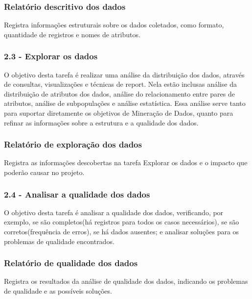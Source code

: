 \subsubsection*{Relatório descritivo dos dados}

Registra informações estruturais sobre os dados coletados, como formato, quantidade de registros e nomes de atributos.

\subsubsection*{\textbf{2.3 - Explorar os dados}}

O objetivo desta tarefa é realizar uma análise da distribuição dos dados, através de consultas, visualizações e técnicas de report. Nela estão inclusas análise da distribuição de atributos dos dados, análise do relacionamento entre pares de atributos, análise de subpopulações e análise estatística. Essa análise serve tanto para suportar diretamente os objetivos de Mineração de Dados, quanto para refinar as informações sobre a estrutura e a qualidade dos dados.

\subsubsection*{Relatório de exploração dos dados}

Registra as informações descobertas na tarefa Explorar os dados e o impacto que poderão causar no projeto.

\subsubsection*{\textbf{2.4 - Analisar a qualidade dos dados}}

O objetivo desta tarefa é analisar a qualidade dos dados, verificando, por exemplo, se são completos(há registros para todos os casos necessários), se são corretos(frequência de erros), se há dados ausentes; e analisar soluções para os problemas de qualidade encontrados.

\subsubsection*{Relatório de qualidade dos dados}

Registra os resultados da análise de qualidade dos dados, indicando os problemas de qualidade e as possíveis soluções.

